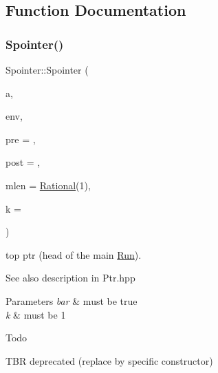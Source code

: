 \subsection{Function Documentation}
\mbox{\label{group__table_ga49f82b7aafd3ae237243c85272597fa7}} 
\subsubsection{\texorpdfstring{Spointer()}{Spointer()}\hspace{0.1cm}{\footnotesize\ttfamily [1/4]}}
{\footnotesize\ttfamily Spointer\+::\+Spointer (\begin{DoxyParamCaption}\item[{\mbox{\hyperlink{classWTA}{W\+TA}} $\ast$}]{a,  }\item[{\mbox{\hyperlink{classEnvironment}{Environment}} $\ast$}]{env,  }\item[{\mbox{\hyperlink{group__general_ga092fe8b972dfa977c2a0886720a7731e}{pre\+\_\+t}}}]{pre = {},  }\item[{\mbox{\hyperlink{group__general_ga092fe8b972dfa977c2a0886720a7731e}{pre\+\_\+t}}}]{post = {},  }\item[{\mbox{\hyperlink{classRational}{Rational}}}]{mlen = {\ttfamily \mbox{\hyperlink{classRational}{Rational}}(1)},  }\item[{size\+\_\+t}]{k = {} }\end{DoxyParamCaption})}



top ptr (head of the main \mbox{\hyperlink{classRun}{Run}}). 

\begin{DoxySeeAlso}{See also}
description in Ptr.\+hpp 
\end{DoxySeeAlso}

\begin{DoxyParams}{Parameters}
{\em bar} & must be true \\
\hline
{\em k} & must be 1 \\
\hline
\end{DoxyParams}
\begin{DoxyRefDesc}{Todo}
\item[\mbox{\hyperlink{todo__todo000032}{Todo}}]T\+BR deprecated (replace by specific constructor) \end{DoxyRefDesc}
\mbox{\label{group__table_ga72441f0d67497c90602a123c45dc53d1}} 
